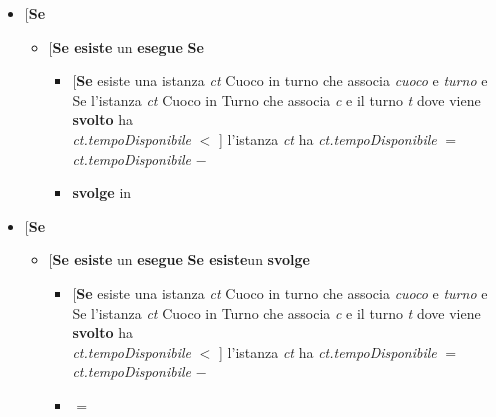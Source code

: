 \begin{itemize}[label=$-$, noitemsep]
	\item {{[}}\textbf{Se}{ }\myuline{turno}{ è specificato{]} }
	\begin{itemize}[label=$-$, noitemsep]
		\item {[}\textbf{Se esiste }{un } \textbf{esegue }\textbf{Se }\myuline{assegnamento.tempoStimato}{ è definito}{]}
		\begin{itemize}[label=$-$, noitemsep]
			\item {{[}}\textbf{Se}{ esiste una istanza} \textit{ct} {Cuoco in turno che associa }\textit{cuoco} e \textit{turno} {e Se {l'istanza }\textit{ct}{ Cuoco in Turno che associa }\textit{c} e il turno \textit{t} dove viene \textbf{svolto}  ha \\\textit{ct.tempoDisponibile} $<$ }{]}
				  {l'istanza }\textit{ct} ha \textit{ct.tempoDisponibile} $=$ \textit{ct.tempoDisponibile} $-$  
			\item {}\textbf{svolge}{ in }
		\end{itemize}
    \end{itemize}
	\item {{[}}\textbf{Se}{ }\myuline{stimaTempo}{ è specificato{]} }                       
	\begin{itemize}[label=$-$, noitemsep]
		\item {[}\textbf{Se esiste }{un } \textbf{esegue }\textbf{Se esiste}{un } \textbf{svolge }\myuline{assegnamento}{]}
		\begin{itemize}[label=$-$, noitemsep]
			\item {{[}}\textbf{Se}{ esiste una istanza} \textit{ct} {Cuoco in turno che associa }\textit{cuoco} e \textit{turno} {e Se {l'istanza }\textit{ct}{ Cuoco in Turno che associa }\textit{c} e il turno \textit{t} dove viene \textbf{svolto}  ha \\\textit{ct.tempoDisponibile} $<$ }{]}
			      {l'istanza }\textit{ct} ha \textit{ct.tempoDisponibile} $=$ \textit{ct.tempoDisponibile} $-$  
			\item {} $=$ 
		\end{itemize}

\end{itemize}
\end{itemize}
